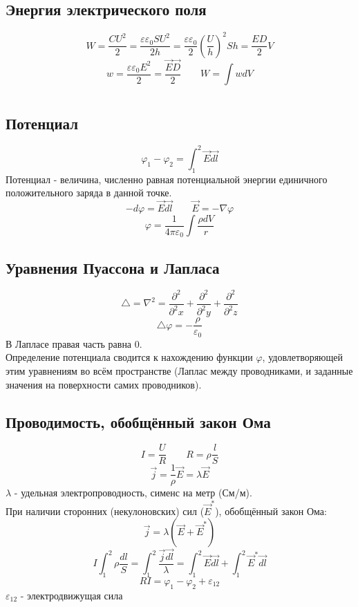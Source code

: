 \documentclass{article}
\begin{document}
\subsection{Энергия электрического поля}
\[W=\frac{CU^2}{2}=\frac{\varepsilon\varepsilon_0 S U^2}{2h}=\frac{\varepsilon\varepsilon_0}{2}(\frac{U}{h})^2Sh=\frac{ED}{2}V\]
\[w=\frac{\varepsilon\varepsilon_0 E^2}{2}=\frac{\vec{E}\vec{D}}{2} \qquad W=\int wdV\]


\section{}
\subsection{Потенциал}
\[\varphi_{1}-\varphi_{2}=\int_{1}^{2}\vec{E}\vec{dl}\]
Потенциал - величина, численно равная потенциальной энергии единичного положительного заряда в данной точке.
\[
    -d\varphi=\vec{E}\vec{dl} \qquad
    \vec{E}=-\nabla\varphi
\]
\[\varphi=\frac{1}{4\pi\varepsilon_0}\int\frac{\rho dV}{r}\]
\subsection{Уравнения Пуассона и Лапласа}
\[\triangle=\nabla^2=\frac{\partial^2}{\partial^2x}+\frac{\partial^2}{\partial^2y}+\frac{\partial^2}{\partial^2z}\]
\[\triangle\varphi=-\frac{\rho}{\varepsilon_0}\]
В Лапласе правая часть равна 0. \\
Определение потенциала сводится к нахождению функции $\varphi$, удовлетворяющей этим уравнениям во всём пространстве (Лаплас между проводниками, и заданные значения на поверхности самих проводников).
\subsection{Проводимость, обобщённый закон Ома}
\[I=\frac{U}{R} \qquad R=\rho\frac{l}{S}\]
\[\vec{j}=\frac{1}{\rho}\vec{E}=\lambda\vec{E}\]
$\lambda$ - удельная электропроводность, сименс на метр (См/м). \\
При наличии сторонних (некулоновских) сил ($\vec{E}^{*}$), обобщённый закон Ома:
\[\vec{j}=\lambda(\vec{E}+\vec{E}^{*})\]
\[I\int_{1}^{2}\rho\frac{dl}{S}=\int_{1}^{2}\frac{\vec{j}\vec{dl}}{\lambda}=\int_{1}^{2}\vec{E}\vec{dl}+\int_{1}^{2}\vec{E}^{*}\vec{dl}\]
\[RI=\varphi_{1}-\varphi_{2}+\varepsilon_{12}\]
$\varepsilon_{12}$ - электродвижущая сила


\section{}
\end{document}

